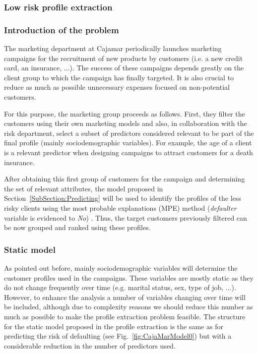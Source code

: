 \subsubsection{Low risk profile extraction}
\subsubsection*{Introduction of the problem}

The marketing department at Cajamar periodically launches marketing campaigns for the recruitment of new products by customers (i.e. a new credit card, an insurance, ...). The success of these campaigns depends greatly on the client group to which the campaign has finally targeted. It is also crucial to reduce as much as possible unnecessary expenses focused on non-potential customers. 

For this purpose, the marketing group proceeds as follows. First, they filter the customers using their own marketing models and also, in collaboration with the risk department, select a subset of predictors considered relevant to be part of the final profile (mainly sociodemographic variables). For example, the age of a client is a relevant predictor when designing campaigns to attract customers for a death insurance. 

After obtaining this first group of customers for the campaign and determining the set of relevant attributes, the model proposed in Section~\ref{SubSection:Predicting} will be used to identify the profiles of the less risky clients using the most probable explanations (MPE) method (\emph{defaulter} variable is evidenced to \emph{No}) . Thus, the target customers previously filtered can be now grouped and ranked using these profiles.


\subsubsection*{Static model}
\label{sec:StaticModel}

As pointed out before, mainly sociodemographic variables will determine the customer profiles used in the campaigns. These variables are mostly static as they do not change frequently over time (e.g. marital status, sex, type of job, ...). However, to enhance the analysis a number of  variables changing over time will be included, although due to complexity reasons we should reduce this number as much as possible to make the profile extraction problem feasible.
The structure for the static model proposed in the profile extraction is the same as for predicting the risk of defaulting (see Fig.~\ref{fig:CajaMarModel0}) but with a considerable reduction in the number of predictors used. 

